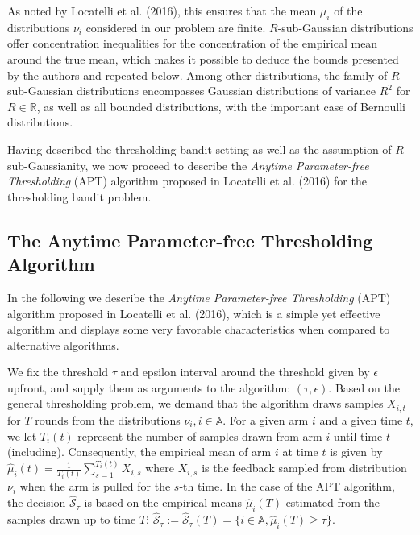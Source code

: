 \documentclass[11pt,]{article}
\begin{document}
As noted by Locatelli et al. (2016), this ensures that the mean
\(\mu_i\) of the distributions \(\nu_i\) considered in our problem are
finite. \(R\)-sub-Gaussian distributions offer concentration
inequalities for the concentration of the empirical mean around the true
mean, which makes it possible to deduce the bounds presented by the
authors and repeated below. Among other distributions, the family of
\(R\)-sub-Gaussian distributions encompasses Gaussian distributions of
variance \(R^2\) for \(R \in \mathbb{R}\), as well as all bounded
distributions, with the important case of Bernoulli distributions.

Having described the thresholding bandit setting as well as the
assumption of \(R\)-sub-Gaussianity, we now proceed to describe the
\emph{Anytime Parameter-free Thresholding} (APT) algorithm proposed in
Locatelli et al. (2016) for the thresholding bandit problem.

\subsection{\texorpdfstring{The Anytime Parameter-free Thresholding
Algorithm
\label{sec:TheAPTAlgorithm}}{The Anytime Parameter-free Thresholding Algorithm }}\label{the-anytime-parameter-free-thresholding-algorithm}

In the following we describe the \emph{Anytime Parameter-free
Thresholding} (APT) algorithm proposed in Locatelli et al. (2016), which
is a simple yet effective algorithm and displays some very favorable
characteristics when compared to alternative algorithms.

We fix the threshold \(\tau\) and epsilon interval around the threshold
given by \(\epsilon\) upfront, and supply them as arguments to the
algorithm: \((\tau, \epsilon)\). Based on the general thresholding
problem, we demand that the algorithm draws samples \(X_{i,t}\) for
\(T\) rounds from the distributions \(\nu_i, i\in \mathbb{A}\). For a
given arm \(i\) and a given time \(t\), we let \(T_i(t)\) represent the
number of samples drawn from arm \(i\) until time \(t\) (including).
Consequently, the empirical mean of arm \(i\) at time \(t\) is given by
\(\hat{\mu}_i(t) = \frac{1}{T_i(t)} \sum_{s=1}^{T_i(t)} X_{i,s}\) where
\(X_{i,s}\) is the feedback sampled from distribution \(\nu_i\) when the
arm is pulled for the \(s\)-th time. In the case of the APT algorithm,
the decision \(\hat{\mathcal{S}}_{\tau}\) is based on the empirical
means \(\hat{\mu}_i(T)\) estimated from the samples drawn up to time
\(T\):
\(\hat{\mathcal{S}}_{\tau} := \hat{\mathcal{S}}_{\tau}(T) = \{i \in \mathbb{A}, \hat{\mu}_i(T) \geq \tau\}\).
\end{document}
